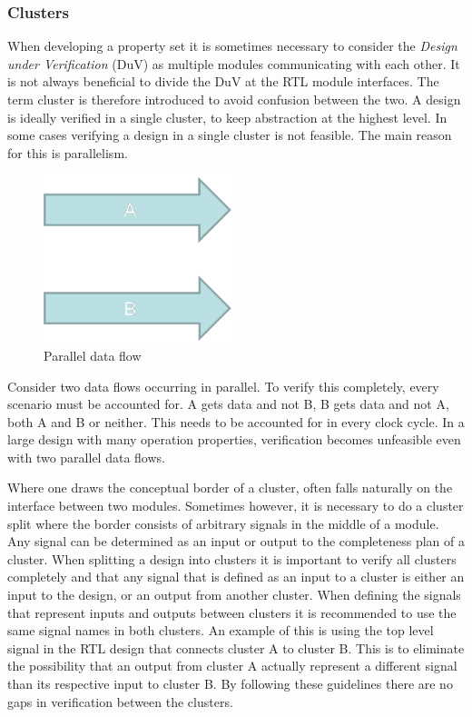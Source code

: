 \subsubsection{Clusters}
\label{sub:clust}
When developing a property set it is sometimes necessary to consider the \textit{Design under Verification} (DuV) as multiple modules communicating with each other. It is not always beneficial to divide the DuV at the RTL module interfaces. The term cluster is therefore introduced to avoid confusion between the two. A design is ideally verified in a single cluster, to keep abstraction at the highest level. In some cases verifying a design in a single cluster is not feasible. The main reason for this is parallelism.\\ 
\begin{figure}
\includegraphics[width=5.5cm]{figs/Verif/parallell.png}
\caption{Parallel data flow}\label{fig:para}
\end{figure} 

Consider two data flows occurring in parallel. To verify this completely, every scenario must be accounted for. A gets data and not B, B gets data and not A, both A and B or neither. This needs to be accounted for in every clock cycle. In a large design with many operation properties, verification becomes unfeasible even with two parallel data flows.     


Where one draws the conceptual border of a cluster, often falls naturally on the interface between two modules. Sometimes however, it is necessary to do a cluster split where the border consists of arbitrary signals in the middle of a module. Any signal can be determined as an input or output to the completeness plan of a cluster\cite{clust}. When splitting a design into clusters it is important to verify all clusters completely and that any signal that is defined as an input to a cluster is either an input to the design, or an output from another cluster. When defining the signals that represent inputs and outputs between clusters it is recommended to use the same signal names in both clusters. An example of this is using the top level signal in the RTL design that connects cluster A to cluster B. This is to eliminate the possibility that an output from cluster A actually represent a different signal than its respective input to cluster B. By following these guidelines there are no gaps in verification between the clusters. 



